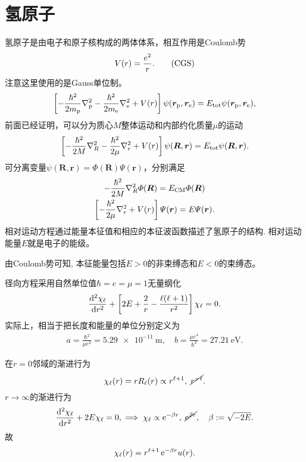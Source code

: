 \section{氢原子}
氢原子是由电子和原子核构成的两体体系，相互作用是Coulomb势 %
\[
	V(r)=\frac{e^2}r.\CGS
\]
注意这里使用的是Gauss单位制。
\[
	\fkh{-\frac{\hbar^2}{2m_\pton}\nabla_\pton^2-\frac{\hbar^2}{2m_\elc}\nabla_\elc^2+V(r)}\psi(\bm r_\pton,\bm r_\elc)=E\tot\psi(\bm r_\pton,\bm r_\elc),
\]
前面已经证明，可以分为质心$M$整体运动和内部约化质量$\mu$的运动
\[
	\fkh{-\frac{\hbar^2}{2M}\nabla_R^2-\frac{\hbar^2}{2\mu}\nabla_r^2+V(r)}\psi(\bm R,\bm r)=E\tot\psi(\bm R,\bm r).
\]
可分离变量$\psi(\bm R,\bm r)=\varPhi(\bm R)\varPsi(\bm r)$，分别满足
\begin{gather*}
	-\frac{\hbar^2}{2M}\nabla_R^2\varPhi(\bm R)=E_\mathrm{CM}\varPhi(\bm R)\\
	\fkh{-\frac{\hbar^2}{2\mu}\nabla_r^2+V(r)}\varPsi(\bm r)=E\varPsi(\bm r).
\end{gather*}
相对运动方程通过能量本征值和相应的本征波函数描述了氢原子的结构. 相对运动能量$E$就是电子的能级。

由Coulomb势可知, 本征能量包括$E>0$的非束缚态和$E<0$的束缚态。

径向方程采用自然单位值$\hbar=e=\mu=1$无量纲化
\[
	\dv[2]{\chi_\ell}r+\fkh{2E+\frac2r-\frac{\ell(\ell+1)}{r^2}}\chi_\ell=0.
\]
实际上，相当于把长度和能量的单位分别定义为
\begin{align}
	a=\frac{\hbar^2}{\mu e^2}=\SI{5.29e-11}\m,\quad b=\frac{\mu e^4}{\hbar^2}=\SI{27.21}\eV.
\end{align}

在$r=0$邻域的渐进行为
\[
	\chi_\ell(r)=rR_\ell(r)\propto r^{\ell+1},\;\cancel{r^{-\ell}}.
\]
$r\to\infty$的渐进行为
\[
	\dv[2]{\chi_\ell}r+2E\chi_\ell=0,\implies\chi_\ell\propto\e{-\beta r},\;\cancel{\e{\beta r}},\quad \beta:=\sqrt{-2E}.
\]
故
\[
	\chi_\ell(r)=r^{\ell+1}\e{-\beta r}u(r).
\]

